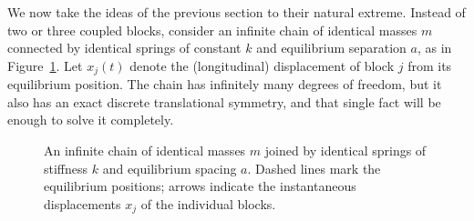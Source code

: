 We now take the ideas of the previous section to their natural extreme. Instead of two or three coupled blocks, consider an infinite chain of identical masses $m$ connected by identical springs of constant $k$ and equilibrium separation $a$, as in Figure~\ref{fig:spring-chain}. Let $x_j(t)$ denote the (longitudinal) displacement of block $j$ from its equilibrium position. The chain has infinitely many degrees of freedom, but it also has an exact discrete translational symmetry, and that single fact will be enough to solve it completely.

\begin{figure}[H]
    \centering
    \caption{An infinite chain of identical masses $m$ joined by identical springs of stiffness $k$ and equilibrium spacing $a$. Dashed lines mark the equilibrium positions; arrows indicate the instantaneous displacements $x_j$ of the individual blocks.}
    \label{fig:spring-chain}
\end{figure}

